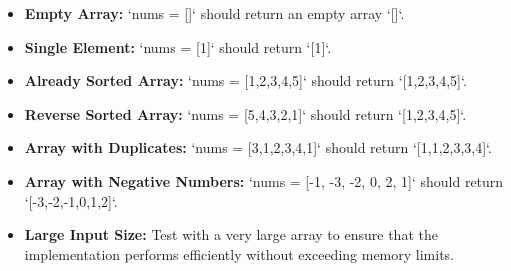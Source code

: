 \begin{itemize}
    \item \textbf{Empty Array:} `nums = []` should return an empty array `[]`.
    
    \item \textbf{Single Element:} `nums = [1]` should return `[1]`.
    
    \item \textbf{Already Sorted Array:} `nums = [1,2,3,4,5]` should return `[1,2,3,4,5]`.
    
    \item \textbf{Reverse Sorted Array:} `nums = [5,4,3,2,1]` should return `[1,2,3,4,5]`.
    
    \item \textbf{Array with Duplicates:} `nums = [3,1,2,3,4,1]` should return `[1,1,2,3,3,4]`.
    
    \item \textbf{Array with Negative Numbers:} `nums = [-1, -3, -2, 0, 2, 1]` should return `[-3,-2,-1,0,1,2]`.
    
    \item \textbf{Large Input Size:} Test with a very large array to ensure that the implementation performs efficiently without exceeding memory limits.
\end{itemize}

\printindex
